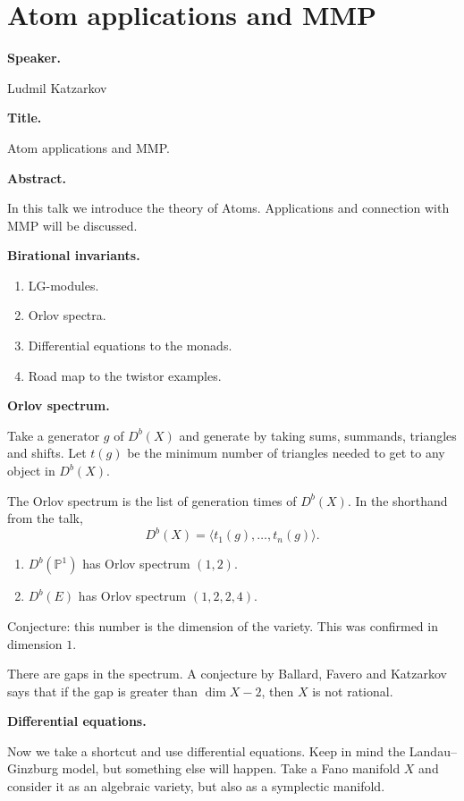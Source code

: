 \section{Atom applications and
MMP}
\label{section-atom-applications-and-
mmp}

\medskip\noindent
{\bf Speaker.}

Ludmil Katzarkov

\medskip\noindent
{\bf Title.}

Atom applications and MMP.

\medskip\noindent
{\bf Abstract.}

In this talk we introduce the
theory of Atoms.
Applications and connection with
MMP will be discussed.

\medskip\noindent
{\bf Birational invariants.}

\begin{enumerate}
\item LG-modules.
\item Orlov spectra.
\item Differential equations to the
monads.
\item Road map to the twistor
examples.
\end{enumerate}

\medskip\noindent
{\bf Orlov spectrum.}

Take a generator $g$ of
$D^b(X)$ and generate by taking
sums, summands, triangles and
shifts.
Let $t(g)$ be the minimum number of
triangles needed to get to any
object in $D^b(X)$.

The Orlov spectrum is the list of
generation times of
$D^b(X)$.
In the shorthand from the talk,
$$
D^b(X)=
\langle
t_1(g),\dots,t_n(g)
\rangle.
$$

\begin{enumerate}
\item $D^b(\mathbb{P}^1)$ has Orlov
spectrum $(1,2)$.
\item $D^b(E)$ has Orlov spectrum
$(1,2,2,4)$.
\end{enumerate}

Conjecture: this number is the
dimension of the variety.
This was confirmed in dimension $1$.

There are gaps in the spectrum.
A conjecture by Ballard, Favero and
Katzarkov says that if the gap is
greater than $\dim X-2$, then
$X$ is not rational.

\medskip\noindent
{\bf Differential equations.}

Now we take a shortcut and use
differential equations.
Keep in mind the Landau--Ginzburg
model, but something else will
happen.
Take a Fano manifold $X$ and
consider it as an algebraic
variety, but also as a symplectic
manifold.

